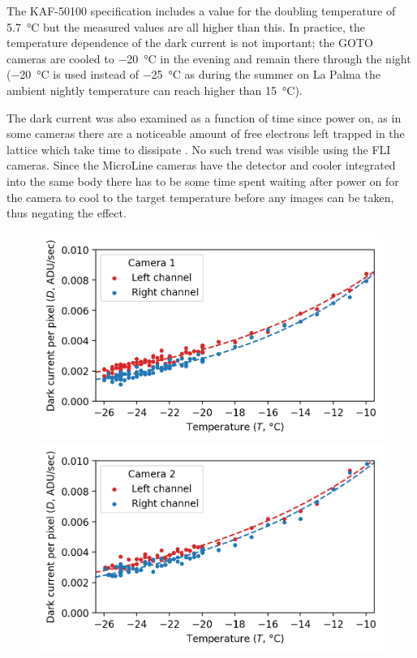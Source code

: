 \begin{colsection}
The KAF-50100 specification includes a value for the doubling temperature of \SI{5.7}{\celsius} but the measured values are all higher than this. In practice, the temperature dependence of the dark current is not important; the GOTO cameras are cooled to \SI{-20}{\celsius} in the evening and remain there through the night (\SI{-20}{\celsius} is used instead of \SI{-25}{\celsius} as during the summer on La Palma the ambient nightly temperature can reach higher than \SI{15}{\celsius}).

The dark current was also examined as a function of time since power on, as in some cameras there are a noticeable amount of free electrons left trapped in the lattice which take time to dissipate \citep{Liam}. No such trend was visible using the FLI cameras. Since the MicroLine cameras have the detector and cooler integrated into the same body there has to be some time spent waiting after power on for the camera to cool to the target temperature before any images can be taken, thus negating the effect.

\begin{figure}[p]
    \begin{center}
        \begin{minipage}[t]{0.49\linewidth}\vspace{10pt}
            \includegraphics[width=\linewidth]{images/detectors/dc_1.png}
        \end{minipage}
        \begin{minipage}[t]{0.49\linewidth}\vspace{10pt}
            \includegraphics[width=\linewidth]{images/detectors/dc_2.png}
        \end{minipage}


\end{center}
\end{figure}
\end{colsection}
